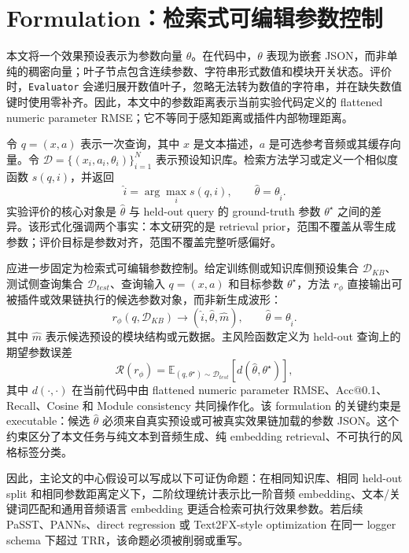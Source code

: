 \chapter{Formulation：检索式可编辑参数控制}
\label{chap:formulation}

本文将一个效果预设表示为参数向量 $\theta$。在代码中，$\theta$ 表现为嵌套 JSON，而非单纯的稠密向量；叶子节点包含连续参数、字符串形式数值和模块开关状态。评价时，\texttt{Evaluator} 会递归展开数值叶子，忽略无法转为数值的字符串，并在缺失数值键时使用零补齐。因此，本文中的参数距离表示当前实验代码定义的 flattened numeric parameter RMSE；它不等同于感知距离或插件内部物理距离。

令 $q=(x,a)$ 表示一次查询，其中 $x$ 是文本描述，$a$ 是可选参考音频或其缓存向量。令 $\mathcal{D}=\{(x_i,a_i,\theta_i)\}_{i=1}^{N}$ 表示预设知识库。检索方法学习或定义一个相似度函数 $s(q,i)$，并返回
\[
	\hat{i}=\arg\max_i s(q,i), \qquad \hat{\theta}=\theta_{\hat{i}}.
\]
实验评价的核心对象是 $\hat{\theta}$ 与 held-out query 的 ground-truth 参数 $\theta^\star$ 之间的差异。该形式化强调两个事实：本文研究的是 retrieval prior，范围不覆盖从零生成参数；评价目标是参数对齐，范围不覆盖完整听感偏好。

应进一步固定为检索式可编辑参数控制。给定训练侧或知识库侧预设集合 $\mathcal{D}_{KB}$、测试侧查询集合 $\mathcal{D}_{test}$、查询输入 $q=(x,a)$ 和目标参数 $\theta^\star$，方法 $r_\phi$ 直接输出可被插件或效果链执行的候选参数对象，而非新生成波形：
\[
	r_\phi(q,\mathcal{D}_{KB}) \rightarrow (\hat{i},\hat{\theta},\hat{m}), \qquad \hat{\theta}=\theta_{\hat{i}}.
\]
其中 $\hat{m}$ 表示候选预设的模块结构或元数据。主风险函数定义为 held-out 查询上的期望参数误差
\[
	\mathcal{R}(r_\phi)=\mathbb{E}_{(q,\theta^\star)\sim\mathcal{D}_{test}}\left[d(\hat{\theta},\theta^\star)\right],
\]
其中 $d(\cdot,\cdot)$ 在当前代码中由 flattened numeric parameter RMSE、Acc@0.1、Recall、Cosine 和 Module consistency 共同操作化。该 formulation 的关键约束是 executable：候选 $\hat{\theta}$ 必须来自真实预设或可被真实效果链加载的参数 JSON。这个约束区分了本文任务与纯文本到音频生成、纯 embedding retrieval、不可执行的风格标签分类。

因此，主论文的中心假设可以写成以下可证伪命题：在相同知识库、相同 held-out split 和相同参数距离定义下，二阶纹理统计表示比一阶音频 embedding、文本/关键词匹配和通用音频语言 embedding 更适合检索可执行效果参数。若后续 PaSST、PANNs、direct regression 或 Text2FX-style optimization 在同一 logger schema 下超过 TRR，该命题必须被削弱或重写。

